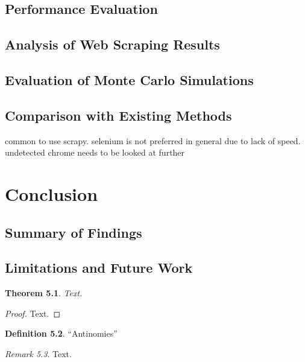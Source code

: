 \documentclass{thesis-ekf}
\newtheorem{theorem}{Theorem}[chapter]
\theoremstyle{definition}
\newtheorem{definition}[theorem]{Definition}
\theoremstyle{remark}
\newtheorem{remark}[theorem]{Remark}
\begin{document}
\section{Performance Evaluation}

\section{Analysis of Web Scraping Results}
\section{Evaluation of Monte Carlo Simulations}
\section{Comparison with Existing Methods}
common to use scrapy. selenium is not preferred in general due to lack of speed. undetected chrome needs to be looked at further



\chapter{Conclusion}
\section{Summary of Findings}

\section{Limitations and Future Work}







\begin{theorem}
Text.
\end{theorem}

\begin{proof}
Text.
\end{proof}

\begin{definition}
``Antinomies''
\end{definition}

\begin{remark}
Text.
\end{remark}
\end{document}
